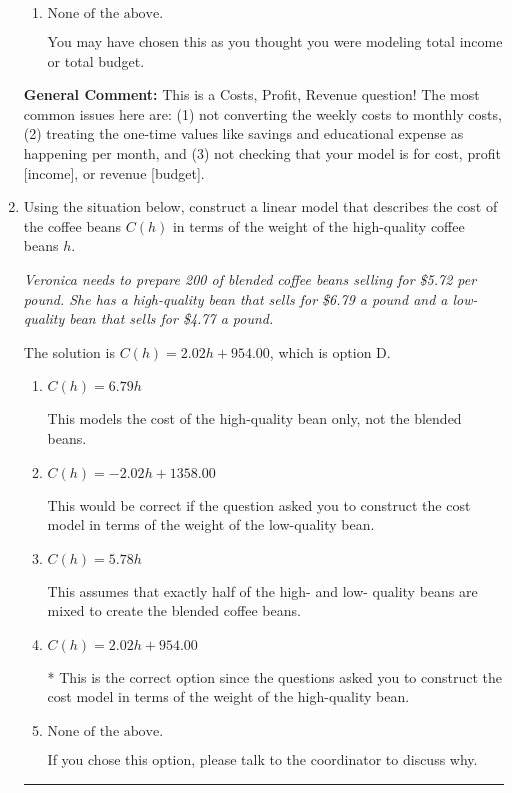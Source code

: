 \documentclass{extbook}[14pt]
\newcommand{\litem}[1]{\item #1

\rule{\textwidth}{0.4pt}}
\begin{document}
\begin{enumerate}
{\begin{enumerate}[label=\Alph*.]
This treats weekly expenses as month expenses rather than multiplying each weekly expense by 4 AND does not account for these expenses per month.
\item \( \text{None of the above.} \)

You may have chosen this as you thought you were modeling total income or total budget.
\end{enumerate}

\textbf{General Comment:} This is a Costs, Profit, Revenue question! The most common issues here are: (1) not converting the weekly costs to monthly costs, (2) treating the one-time values like savings and educational expense as happening per month, and (3) not checking that your model is for cost, profit [income], or revenue [budget].
}
\litem{
Using the situation below, construct a linear model that describes the cost of the coffee beans $C(h)$ in terms of the weight of the high-quality coffee beans $h$.

\begin{center}
    \textit{ Veronica needs to prepare 200 of blended coffee beans selling for \$5.72 per pound. She has a high-quality bean that sells for \$6.79 a pound and a low-quality bean that sells for \$4.77 a pound. }
\end{center}
The solution is \( C(h) = 2.02 h + 954.00 \), which is option D.\begin{enumerate}[label=\Alph*.]
\item \( C(h) = 6.79 h \)

This models the cost of the high-quality bean only, not the blended beans.
\item \( C(h) = -2.02 h + 1358.00 \)

This would be correct if the question asked you to construct the cost model in terms of the weight of the low-quality bean.
\item \( C(h) = 5.78 h \)

This assumes that exactly half of the high- and low- quality beans are mixed to create the blended coffee beans.
\item \( C(h) = 2.02 h + 954.00 \)

* This is the correct option since the questions asked you to construct the cost model in terms of the weight of the high-quality bean.
\item \( \text{None of the above.} \)

If you chose this option, please talk to the coordinator to discuss why.
\end{enumerate}

}
\end{enumerate}
\end{document}
